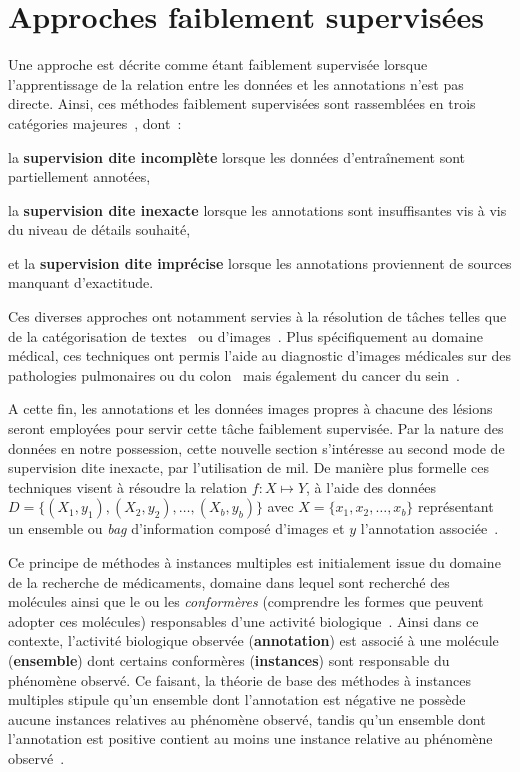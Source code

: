 \section{Approches faiblement supervisées}
\label{sec:patient_decision_weak}
Une approche est décrite comme étant faiblement supervisée lorsque l'apprentissage de la relation entre les données et les annotations n'est pas directe. Ainsi, ces méthodes faiblement supervisées sont rassemblées en trois catégories majeures~\cite{Zhou2018}, dont~:
\begin{inlinerate}
    \item la \textbf{supervision dite incomplète} lorsque les données d'entraînement sont partiellement annotées,
    \item la \textbf{supervision dite inexacte} lorsque les annotations sont insuffisantes vis à vis du niveau de détails souhaité,
    \item et la \textbf{supervision dite imprécise} lorsque les annotations proviennent de sources manquant d'exactitude.
\end{inlinerate} Ces diverses approches ont notamment servies à la résolution de tâches telles que de la catégorisation de textes~\cite{Andrews2003,Settles2008} ou d'images~\cite{Chen2004,Tang2009}. Plus spécifiquement au domaine médical, ces techniques ont permis l'aide au diagnostic d'images médicales sur des pathologies pulmonaires ou du colon~\cite{Dundar2007} mais également du cancer du sein~\cite{Sudharshan2019}.\par

A cette fin, les annotations et les données images propres à chacune des lésions seront employées pour servir cette tâche faiblement supervisée. Par la nature des données en notre possession, cette nouvelle section s'intéresse au second mode de supervision dite inexacte, par l'utilisation de \gls{mil}. De manière plus formelle ces techniques visent à résoudre la relation $f: X \mapsto Y$, à l'aide des données $D=\{(X_1,y_1),(X_2,y_2),\ldots,(X_b,y_b)\}$ avec $X=\{x_1,x_2,\ldots,x_b\}$ représentant un ensemble ou \textit{bag} d'information composé d'images et $y$ l'annotation associée~\cite{foulds2010}.\par

Ce principe de méthodes à instances multiples est initialement issue du domaine de la recherche de médicaments, domaine dans lequel sont recherché des molécules ainsi que le ou les \textit{conformères} (comprendre les formes que peuvent adopter ces molécules) responsables d'une activité biologique~\cite{Dietterich1997}. Ainsi dans ce contexte, l'activité biologique observée (\textbf{annotation}) est associé à une molécule (\textbf{ensemble}) dont certains conformères (\textbf{instances}) sont responsable du phénomène observé. Ce faisant, la théorie de base des méthodes à instances multiples stipule qu'un ensemble dont l'annotation est négative ne possède aucune instances relatives au phénomène observé, tandis qu'un ensemble dont l'annotation est positive contient au moins une instance relative au phénomène observé~\cite{Dietterich1997}.\par

